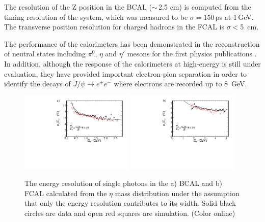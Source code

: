 The resolution of the Z position in the BCAL ($\sim$\,2.5 cm) is computed from the timing resolution of the system, which was measured to be $\sigma=150$\,ps at 1\,GeV. The transverse position resolution for charged hadrons in the FCAL is $\sigma<$5~cm. 

The performance of the calorimeters has been demonstrated in the reconstruction of neutral states including $\pi^0$, $\eta$ and $\eta'$ mesons for the first \gx{} physics publications \cite{AlGhoul:2017nbp,Adhikari:2019gfa}. In addition, although the response of the calorimeters at high-energy is still under evaluation, they have provided important electron-pion separation in order to identify the decays of $J/\psi\rightarrow e^+e^-$ \cite{Ali:2019lzf} where electrons are recorded up to 8~GeV. 

\begin{figure}[tbh]\centering
\includegraphics[width=0.48\textwidth]{figures/fit_BCAL_energy_resolution_sigma.pdf} \includegraphics[width=0.48\textwidth]{figures/fit_FCAL_energy_resolution_sigma.pdf}
\caption{\label{fig:bcal:eta_resolution} 
The energy resolution of single photons in the a) BCAL and b) FCAL calculated from the $\eta$ mass distribution under the assumption that only the energy resolution contributes to its width.  Solid black circles are data and open red squares are simulation.
(Color online)
 }
\end{figure}    


